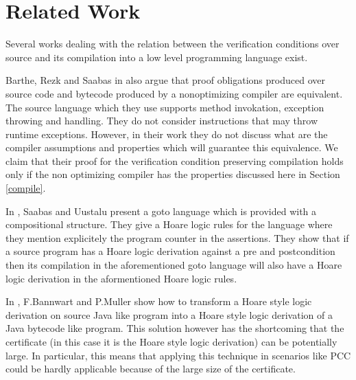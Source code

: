 \section{Related Work}\label{pog:relWork}


Several works dealing with the relation between the 
verification conditions over source and its compilation into a low  level  programming  language exist.

Barthe, Rezk and Saabas in \cite{gta05:fast} also argue that proof obligations produced
over source code and
bytecode produced by a nonoptimizing compiler   are equivalent.
The source language which they use supports method invokation, exception throwing and handling. 
They do not consider instructions that may throw
runtime exceptions. 
 However, in their work they do not discuss  what are the compiler assumptions
and properties  which will guarantee this equivalence. We claim that their proof for
 the verification condition preserving compilation holds only if the non optimizing 
 compiler has the properties discussed here in Section \ref{compile}.


In \cite{SU05CNS}, Saabas and Uustalu present a goto language which is provided with a compositional structure.
They give a Hoare logic rules for the language where they mention explicitely the program counter in the assertions. 
They show that if a source program has a Hoare logic derivation
 against a pre and postcondition then its compilation in the aforementioned goto language will also have a Hoare
 logic derivation in the aformentioned Hoare logic rules.
 


 In \cite{FB04LBT}, F.Bannwart and P.Muller show how to transform a Hoare style logic derivation on source Java like
 program into a Hoare style logic derivation of a Java bytecode like program. This solution however has the shortcoming
that the certificate (in this case it is the Hoare style logic derivation) can be potentially large. In particular, this means that
applying this technique in scenarios like PCC could be hardly applicable because of the large size of the certificate. 
    


